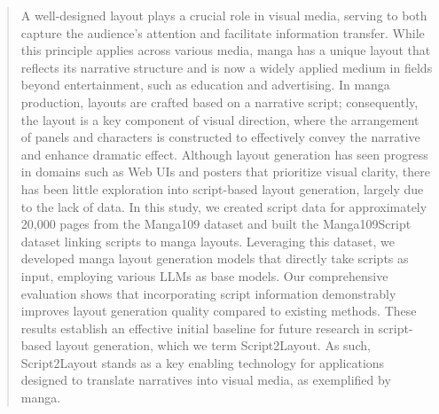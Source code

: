 \begin{abstract}
  A well-designed layout plays a crucial role in visual media, serving to both capture the audience's attention and facilitate information transfer. While this principle applies across various media, manga has a unique layout that reflects its narrative structure and is now a widely applied medium in fields beyond entertainment, such as education and advertising. In manga production, layouts are crafted based on a narrative script; consequently, the layout is a key component of visual direction, where the arrangement of panels and characters is constructed to effectively convey the narrative and enhance dramatic effect. Although layout generation has seen progress in domains such as Web UIs and posters that prioritize visual clarity, there has been little exploration into script-based layout generation, largely due to the lack of data. In this study, we created script data for approximately 20,000 pages from the Manga109 dataset and built the Manga109Script dataset linking scripts to manga layouts. Leveraging this dataset, we developed manga layout generation models that directly take scripts as input, employing various LLMs as base models. Our comprehensive evaluation shows that incorporating script information demonstrably improves layout generation quality compared to existing methods. These results establish an effective initial baseline for future research in script-based layout generation, which we term Script2Layout. As such, Script2Layout stands as a key enabling technology for applications designed to translate narratives into visual media, as exemplified by manga.
\end{abstract}
